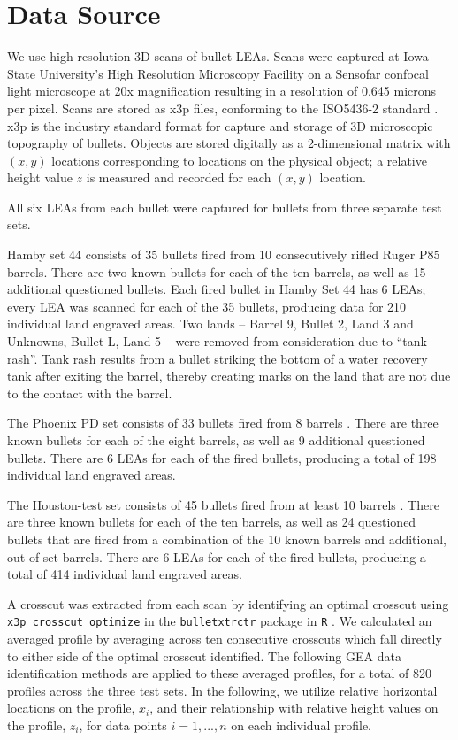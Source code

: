 \documentclass[12pt]{article}
\begin{document}
\section{Data Source}

We use high resolution 3D scans of bullet LEAs. Scans were captured at
Iowa State University's High Resolution Microscopy Facility on a
Sensofar confocal light microscope at 20x magnification resulting in a
resolution of 0.645 microns per pixel. Scans are stored as x3p files,
conforming to the ISO5436-2 standard \citep{ISO5436}. x3p is the
industry standard format for capture and storage of 3D microscopic
topography of bullets. Objects are stored digitally as a 2-dimensional
matrix with \((x,y)\) locations corresponding to locations on the
physical object; a relative height value \(z\) is measured and recorded
for each \((x,y)\) location.

All six LEAs from each bullet were captured for bullets from three
separate test sets.

Hamby set 44 consists of 35 bullets fired from 10 consecutively rifled
Ruger P85 barrels. There are two known bullets for each of the ten
barrels, as well as 15 additional questioned bullets. Each fired bullet
in Hamby Set 44 has 6 LEAs; every LEA was scanned for each of the 35
bullets, producing data for 210 individual land engraved areas. Two
lands -- Barrel 9, Bullet 2, Land 3 and Unknowns, Bullet L, Land 5 --
were removed from consideration due to ``tank rash''. Tank rash results
from a bullet striking the bottom of a water recovery tank after exiting
the barrel, thereby creating marks on the land that are not due to the
contact with the barrel.

The Phoenix PD set consists of 33 bullets fired from 8 barrels
{\color{teal}{more information on the type of barrels?}}. There are
three known bullets for each of the eight barrels, as well as 9
additional questioned bullets. There are 6 LEAs for each of the fired
bullets, producing a total of 198 individual land engraved areas.

The Houston-test set consists of 45 bullets fired from at least 10
barrels {\color{teal}{more information on the type of barrels?}}. There
are three known bullets for each of the ten barrels, as well as 24
questioned bullets that are fired from a combination of the 10 known
barrels and additional, out-of-set barrels. There are 6 LEAs for each of
the fired bullets, producing a total of 414 individual land engraved
areas.

A crosscut was extracted from each scan by identifying an optimal
crosscut using \texttt{x3p\_crosscut\_optimize} in the
\texttt{bulletxtrctr} package in \texttt{R} \cite{bulletxtrctr}. We
calculated an averaged profile by averaging across ten consecutive
crosscuts which fall directly to either side of the optimal crosscut
identified. The following GEA data identification methods are applied to
these averaged profiles, for a total of 820 profiles across the three
test sets. In the following, we utilize relative horizontal locations on
the profile, \(x_i\), and their relationship with relative height values
on the profile, \(z_i\), for data points \(i = 1, ..., n\) on each
individual profile.
\end{document}
